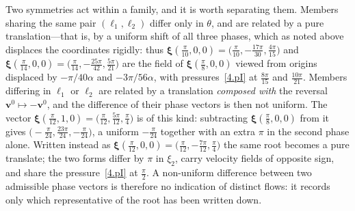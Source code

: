 \documentclass[11pt]{jfm}
\numberwithin{equation}{section}
\begin{document}
Two symmetries act within a family, and it is worth separating them. Members sharing the same pair
$(\ell_1,\ell_2)$ differ only in $\theta$, and are related by a pure translation---that is, by a
uniform shift of all three phases, which as noted above displaces the coordinates rigidly: thus
$\boldsymbol{\xi}(\tfrac{\pi}{10},0,0)=\bigl(\tfrac{\pi}{10},-\tfrac{17\pi}{30},\tfrac{4\pi}{15}\bigr)$
and
$\boldsymbol{\xi}(\tfrac{\pi}{14},0,0)=\bigl(\tfrac{\pi}{14},-\tfrac{25\pi}{42},\tfrac{5\pi}{21}\bigr)$
are the field of $\boldsymbol{\xi}(\tfrac{\pi}{8},0,0)$ viewed from origins displaced by
$-\pi/40\alpha$ and $-3\pi/56\alpha$, with pressures~\eqref{4.pI} at
$\tfrac{8\pi}{15}$ and $\tfrac{10\pi}{21}$. Members differing in $\ell_1$ or $\ell_2$ are related
by a translation \emph{composed with} the reversal
$\boldsymbol{v}^0\mapsto-\boldsymbol{v}^0$, and the difference of their phase vectors is then not
uniform. The vector
$\boldsymbol{\xi}(\tfrac{\pi}{12},1,0)=\bigl(\tfrac{\pi}{12},\tfrac{5\pi}{12},\tfrac{\pi}{4}\bigr)$
is of this kind: subtracting $\boldsymbol{\xi}(\tfrac{\pi}{8},0,0)$ from it gives
$\bigl(-\tfrac{\pi}{24},\tfrac{23\pi}{24},-\tfrac{\pi}{24}\bigr)$, a uniform
$-\tfrac{\pi}{24}$ together with an extra $\pi$ in the second phase alone. Written instead as
$\boldsymbol{\xi}(\tfrac{\pi}{12},0,0)=\bigl(\tfrac{\pi}{12},-\tfrac{7\pi}{12},\tfrac{\pi}{4}\bigr)$
the same root becomes a pure translate; the two forms differ by $\pi$ in $\xi_2$, carry velocity
fields of opposite sign, and share the pressure~\eqref{4.pI} at $\tfrac{\pi}{2}$. A non-uniform
difference between two admissible phase vectors is therefore no indication of distinct flows: it
records only which representative of the root has been written down.
\end{document}
